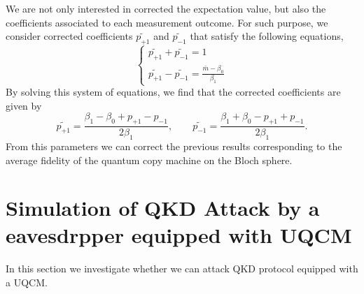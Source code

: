 \documentclass[11pt]{article}
\begin{document}
We are not only interested in corrected the expectation value, but also the coefficients associated to each measurement outcome. For such purpose, we consider corrected coefficients $\tilde{p_{+1}}$ and $\tilde{p_{-1}}$ that satisfy the following equations,
\begin{equation}
\left\{ \begin{array}{c}
\tilde{p_{+1}} + \tilde{p_{-1}} = 1\\
\tilde{p_{+1}} - \tilde{p_{-1}} = \frac{\bar{m}-\beta_0}{\beta_1}
\end{array} \right.
\end{equation}
By solving this system of equations, we find that the corrected coefficients are given by
\begin{equation}
\tilde{p_{+1}} = \frac{\beta_1-\beta_0+p_{+1}-p_{-1}}{2\beta_1},\qquad \tilde{p_{-1}} = \frac{\beta_1+\beta_0-p_{+1}+p_{-1}}{2\beta_1}.
\end{equation} 
From this parameters we can correct the previous results corresponding to the average fidelity of the quantum copy machine on the Bloch sphere. 

\section{Simulation of QKD Attack by a eavesdrpper equipped with UQCM}
In this section we investigate whether we can attack QKD protocol equipped with a UQCM.
\end{document}
